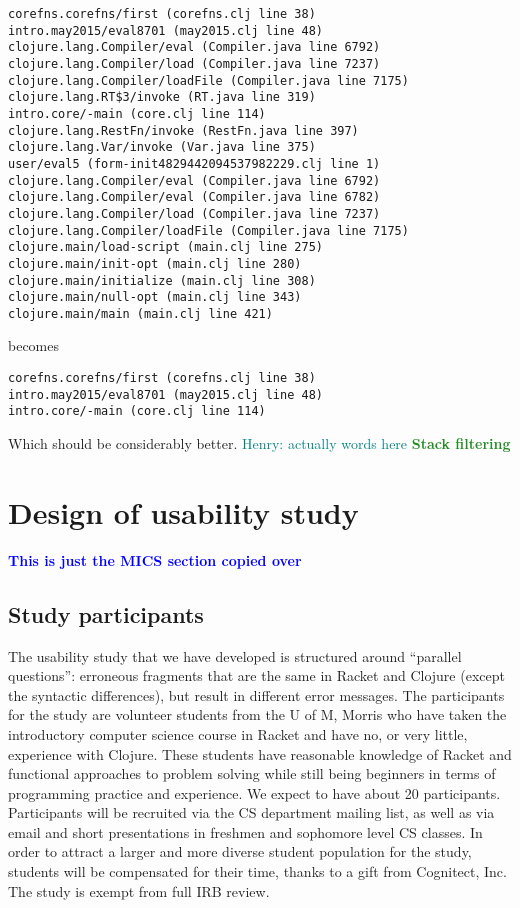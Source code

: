 \documentclass[submission,copyright,creativecommons]{eptcs}
\newcommand{\allcomments}[1]{{#1}}
\newcommand{\emcomment}[1]{{\bf \textcolor{ForestGreen}{\allcomments{{#1}}}}}
\newcommand{\hfcomment}[1]{\textcolor{Teal}{\allcomments{Henry: {#1}}}}
\newcommand{\thcomment}[1]{{\bf \textcolor{blue}{\allcomments{{#1}}}}}
\begin{document}
\begin{verbatim}
corefns.corefns/first (corefns.clj line 38)
intro.may2015/eval8701 (may2015.clj line 48)
clojure.lang.Compiler/eval (Compiler.java line 6792)
clojure.lang.Compiler/load (Compiler.java line 7237)
clojure.lang.Compiler/loadFile (Compiler.java line 7175)
clojure.lang.RT$3/invoke (RT.java line 319)
intro.core/-main (core.clj line 114)
clojure.lang.RestFn/invoke (RestFn.java line 397)
clojure.lang.Var/invoke (Var.java line 375)
user/eval5 (form-init4829442094537982229.clj line 1)
clojure.lang.Compiler/eval (Compiler.java line 6792)
clojure.lang.Compiler/eval (Compiler.java line 6782)
clojure.lang.Compiler/load (Compiler.java line 7237)
clojure.lang.Compiler/loadFile (Compiler.java line 7175)
clojure.main/load-script (main.clj line 275)
clojure.main/init-opt (main.clj line 280)
clojure.main/initialize (main.clj line 308)
clojure.main/null-opt (main.clj line 343)
clojure.main/main (main.clj line 421)
\end{verbatim}
 
becomes 

\begin{verbatim}
corefns.corefns/first (corefns.clj line 38)
intro.may2015/eval8701 (may2015.clj line 48)
intro.core/-main (core.clj line 114)
\end{verbatim} 
 
Which should be considerably better.
\hfcomment{actually words here}
\emcomment{Stack filtering}

\section{Design of usability study}\label{sec:study}
	\thcomment{This is just the MICS section copied over}
	
	\subsection{Study participants}\label{sec:obj}
The usability study that we have developed is structured around ``parallel questions'': erroneous fragments that are the same in 
Racket and Clojure (except the syntactic differences), but result in different error messages.  
The participants for the study are volunteer students from the U of M, Morris who have taken the introductory computer science course in Racket and have no, or very little, experience with Clojure.
These students have reasonable knowledge of Racket and functional approaches to problem solving while still being beginners in terms of programming practice and experience.
We expect to have about 20 participants. 
Participants will be recruited via the CS department mailing list, as well as via email and short presentations in freshmen and sophomore level CS classes. 
In order to attract a larger and more diverse student population for the study, students will be compensated for their time, thanks to a gift from Cognitect, Inc. 
The study is exempt from full IRB review. 
\end{document}
